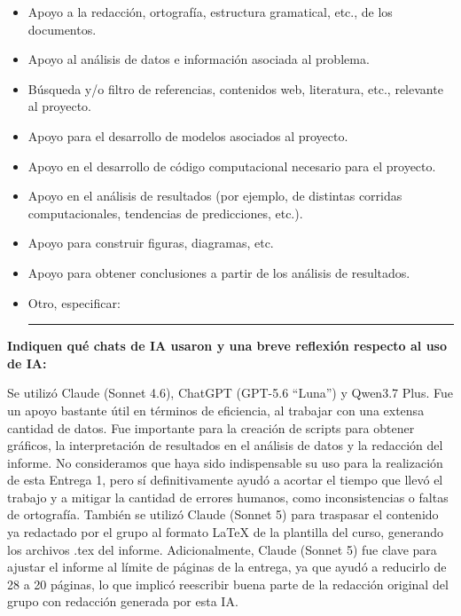 \begin{itemize}
\setlength{\itemsep}{2pt}
\item[$\boxtimes$] Apoyo a la redacci\'on, ortograf\'ia, estructura gramatical, etc., de los documentos.
\item[$\boxtimes$] Apoyo al an\'alisis de datos e informaci\'on asociada al problema.
\item[$\boxtimes$] B\'usqueda y/o filtro de referencias, contenidos web, literatura, etc., relevante al proyecto.
\item[$\square$] Apoyo para el desarrollo de modelos asociados al proyecto.
\item[$\boxtimes$] Apoyo en el desarrollo de c\'odigo computacional necesario para el proyecto.
\item[$\square$] Apoyo en el an\'alisis de resultados (por ejemplo, de distintas corridas computacionales, tendencias de predicciones, etc.).
\item[$\square$] Apoyo para construir figuras, diagramas, etc.
\item[$\boxtimes$] Apoyo para obtener conclusiones a partir de los an\'alisis de resultados.
\item[$\square$] Otro, especificar: \rule{6cm}{0.4pt}
\end{itemize}

\vspace{0.3cm}

\noindent \textbf{Indiquen qu\'e chats de IA usaron y una breve reflexi\'on respecto al uso de IA:}

\vspace{0.2cm}

\noindent Se utiliz\'o Claude (Sonnet 4.6), ChatGPT (GPT-5.6 ``Luna'') y Qwen3.7 Plus. Fue un apoyo bastante \'util en t\'erminos de eficiencia, al trabajar con una extensa cantidad de datos. Fue importante para la creaci\'on de scripts para obtener gr\'aficos, la interpretaci\'on de resultados en el an\'alisis de datos y la redacci\'on del informe. No consideramos que haya sido indispensable su uso para la realizaci\'on de esta Entrega 1, pero s\'i definitivamente ayud\'o a acortar el tiempo que llev\'o el trabajo y a mitigar la cantidad de errores humanos, como inconsistencias o faltas de ortograf\'ia. Tambi\'en se utiliz\'o Claude (Sonnet 5) para traspasar el contenido ya redactado por el grupo al formato LaTeX de la plantilla del curso, generando los archivos .tex del informe. Adicionalmente, Claude (Sonnet 5) fue clave para ajustar el informe al l\'imite de p\'aginas de la entrega, ya que ayud\'o a reducirlo de 28 a 20 p\'aginas, lo que implic\'o reescribir buena parte de la redacci\'on original del grupo con redacci\'on generada por esta IA.

